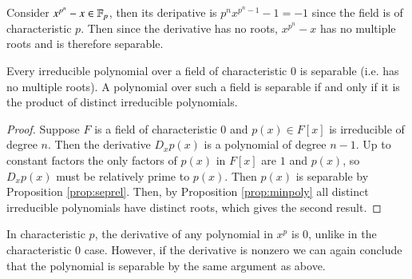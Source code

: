 \begin{example}
    Consider $x^{p^n}-x \in \mathbb F_p$, then its deripative is $p^nx^{p^n-1}-1 = -1$ since the field is of characteristic $p$. Then since the derivative has no roots, $x^{p^n}-x$ has no multiple roots and is therefore separable.
\end{example}

\begin{corollary}
    Every irreducible polynomial over a field of characteristic $0$ is separable (i.e. has no multiple roots). A polynomial over such a field is separable if and only if it is the product of distinct irreducible polynomials.
\end{corollary}
\begin{proof}
    Suppose $F$ is a field of characteristic $0$ and $p(x) \in F[x]$ is irreducible of degree $n$. Then the derivative $D_xp(x)$ is a polynomial of degree $n-1$. Up to constant factors the only factors of $p(x)$ in $F[x]$ are $1$ and $p(x)$, so $D_xp(x)$ must be relatively prime to $p(x)$. Then $p(x)$ is separable by Proposition \ref{prop:seprel}. Then, by Proposition \ref{prop:minpoly} all distinct irreducible polynomials have distinct roots, which gives the second result.
\end{proof}

In characteristic $p$, the derivative of any polynomial in $x^p$ is $0$, unlike in the characteristic $0$ case. However, if the derivative is nonzero we can again conclude that the polynomial is separable by the same argument as above.

